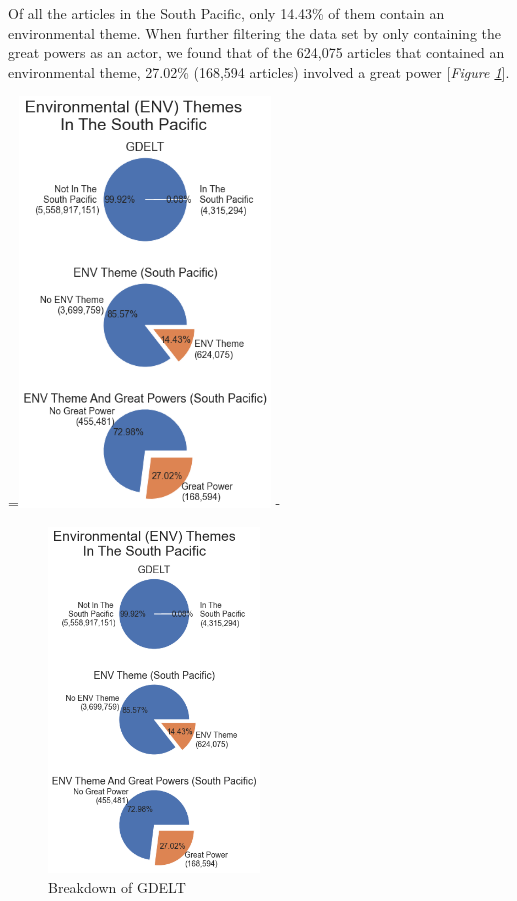\documentclass[12pt]{article}
\makeatletter
\newcommand{\checkheight}[1]{%
  \par \penalty-100\begingroup%
  \setbox8=\hbox{#1}%
  \setlength{\dimen@}{\ht8}%
  \dimen@ii\pagegoal \advance\dimen@ii-\pagetotal
  \ifdim \dimen@>\dimen@ii
    \break
  \fi\endgroup}
\makeatother
\begin{document}
Of all the articles in the South Pacific, only 14.43\% of them contain an environmental theme. When further filtering the data set by only containing the great powers as an actor, we found that of the 624,075 articles that contained an environmental theme, 27.02\% (168,594 articles) involved a great power [\textit{Figure \ref{fig:mesh1}}]. 
\checkheight{\includegraphics[width=0.5\textwidth]{GDELT Pie}}
\begin{figure}
\vspace{-40pt}
  \begin{center}
    \includegraphics[width=0.5\textwidth]{GDELT Pie}
  \end{center}
  \vspace{-20pt}
  \caption{Breakdown of GDELT}
  \vspace{-60pt}
  \label{fig:mesh1}
\end{figure}
\end{document}

